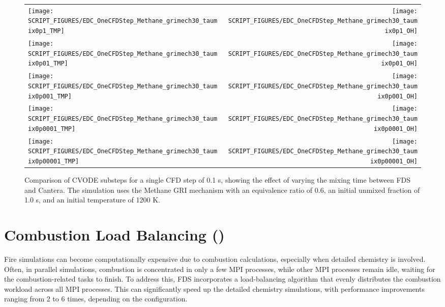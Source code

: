 \documentclass[11pt]{book}
\begin{document}
\begin{figure}[p]
\begin{tabular*}{\textwidth}{lr}
\texttt{[image: SCRIPT\_FIGURES/EDC\_OneCFDStep\_Methane\_grimech30\_taumix0p1\_TMP]} &
\texttt{[image: SCRIPT\_FIGURES/EDC\_OneCFDStep\_Methane\_grimech30\_taumix0p1\_OH]} \\
\texttt{[image: SCRIPT\_FIGURES/EDC\_OneCFDStep\_Methane\_grimech30\_taumix0p01\_TMP]} &
\texttt{[image: SCRIPT\_FIGURES/EDC\_OneCFDStep\_Methane\_grimech30\_taumix0p01\_OH]} \\
\texttt{[image: SCRIPT\_FIGURES/EDC\_OneCFDStep\_Methane\_grimech30\_taumix0p001\_TMP]} &
\texttt{[image: SCRIPT\_FIGURES/EDC\_OneCFDStep\_Methane\_grimech30\_taumix0p001\_OH]} \\
\texttt{[image: SCRIPT\_FIGURES/EDC\_OneCFDStep\_Methane\_grimech30\_taumix0p0001\_TMP]} &
\texttt{[image: SCRIPT\_FIGURES/EDC\_OneCFDStep\_Methane\_grimech30\_taumix0p0001\_OH]} \\
\texttt{[image: SCRIPT\_FIGURES/EDC\_OneCFDStep\_Methane\_grimech30\_taumix0p00001\_TMP]} &
\texttt{[image: SCRIPT\_FIGURES/EDC\_OneCFDStep\_Methane\_grimech30\_taumix0p00001\_OH]}
\end{tabular*}
\caption[Results of the  test cases]{Comparison of CVODE substeps for a single CFD step of 0.1 s, showing the effect of varying the mixing time between FDS and Cantera. The simulation uses the Methane GRI mechanism with an equivalence ratio of 0.6, an initial unmixed fraction of 1.0 s, and an initial temperature of 1200 K.}
\label{fig:edc_mixing_cvode_onecfdstep_vary_taumix}
\end{figure}

\section{Combustion Load Balancing ()}
\label{comb_load_bal}

Fire simulations can become computationally expensive due to combustion calculations, especially when detailed chemistry is involved. Often, in parallel simulations, combustion is concentrated in only a few MPI processes, while other MPI processes remain idle, waiting for the combustion-related tasks to finish. To address this, FDS incorporates a load-balancing algorithm that evenly distributes the combustion workload across all MPI processes. This can significantly speed up the detailed chemistry simulations, with performance improvements ranging from 2 to 6 times, depending on the configuration.
\end{document}
